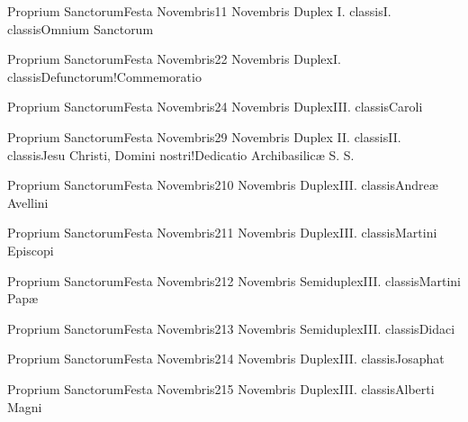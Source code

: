 \documentclass[invitatoriale-romanum.tex]{subfiles}
\begin{document}

	{Proprium Sanctorum}{Festa Novembris}{1}{1 Novembris}
	{Duplex I. classis}{I. classis}{Omnium Sanctorum}
	{}
	{}

	{Proprium Sanctorum}{Festa Novembris}{2}{2 Novembris}
	{Duplex}{I. classis}{Defunctorum!Commemoratio}
	{}
	{}

	{Proprium Sanctorum}{Festa Novembris}{2}{4 Novembris}
	{Duplex}{III. classis}{Caroli}
	{}
	{}

	{Proprium Sanctorum}{Festa Novembris}{2}{9 Novembris}
	{Duplex II. classis}{II. classis}{Jesu Christi, Domini nostri!Dedicatio Archibasilicæ S. S.}
	{}
	{}

	{Proprium Sanctorum}{Festa Novembris}{2}{10 Novembris}
	{Duplex}{III. classis}{Andreæ Avellini}
	{}
	{}

	{Proprium Sanctorum}{Festa Novembris}{2}{11 Novembris}
	{Duplex}{III. classis}{Martini Episcopi}
	{}
	{}

	{Proprium Sanctorum}{Festa Novembris}{2}{12 Novembris}
	{Semiduplex}{III. classis}{Martini Papæ}
	{}
	{}

	{Proprium Sanctorum}{Festa Novembris}{2}{13 Novembris}
	{Semiduplex}{III. classis}{Didaci}
	{}
	{}

	{Proprium Sanctorum}{Festa Novembris}{2}{14 Novembris}
	{Duplex}{III. classis}{Josaphat}
	{}
	{}

	{Proprium Sanctorum}{Festa Novembris}{2}{15 Novembris}
	{Duplex}{III. classis}{Alberti Magni}
	{}
	{}
\end{document}
